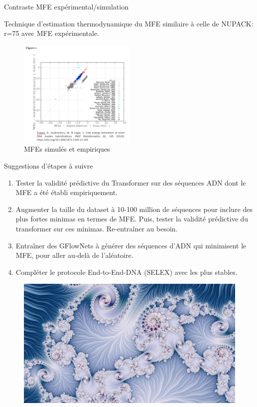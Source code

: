 \documentclass{beamer}
\begin{document}
\begin{frame}{Contraste MFE expérimental/simulation}

Technique d'estimation thermodynamique du MFE similaire à celle de NUPACK: r=75 avec MFE expérimentale.
\begin{figure} \label{fig:MFE_exp_simul}
    \caption{MFEs simulés et empiriques} \center
    \includegraphics[width=0.5\textwidth]{images/MFE_exp_simul.png}
\end{figure}

\end{frame}

\begin{frame}{Suggestions d'étapes à suivre}
\begin{enumerate}
    \item Tester la validité prédictive du Transformer sur des séquences ADN dont le MFE a été établi empiriquement.
    \item Augmenter la taille du dataset à 10-100 million de séquences pour inclure des plus fortes minimas en termes de MFE. Puis, tester la validité prédictive du transformer sur ces minimas. Re-entraîner au besoin.
    \item Entraîner des GFlowNets à générer des séquences d'ADN qui minimisent le MFE, pour aller au-delà de l'aléatoire.
    \item Compléter le protocole End-to-End-DNA (SELEX) avec les plus stables.
\end{enumerate}

\end{frame}

\begin{frame}

\begin{figure} \label{fig:fractal}
    \center
    \includegraphics[width=1\textwidth]{images/Fractal.jpg}
\end{figure}

\end{frame}
\end{document}
